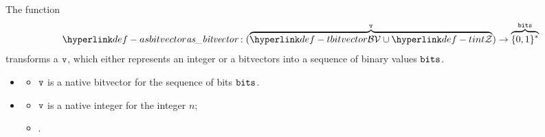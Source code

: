 \FormallyParagraph
\begin{mathpar}
\end{mathpar}

\begin{mathpar}
\end{mathpar}

\hypertarget{def-asbitvector}{}
The function
\[
\asbitvector : (\overname{\tbitvector\cup\tint}{\vv}) \rightarrow \overname{\{0,1\}^*}{\vbits}
\]
transforms a \nativevalue{} $\vv$, which either represents an integer or a bitvectors into
a sequence of binary values $\vbits$.

\ProseParagraph
\OneApplies
\begin{itemize}
  \item {}
  \begin{itemize}
    \item $\vv$ is a native bitvector for the sequence of bits $\vbits$.
  \end{itemize}

  \item {}
  \begin{itemize}
    \item $\vv$ is a native integer for the integer $n$;
    \item {}.
  \end{itemize}
\end{itemize}

\FormallyParagraph
{}

